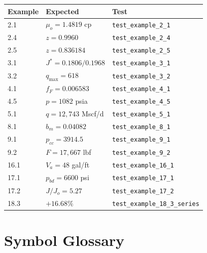 \documentclass[11pt,a4paper,openany]{book}
\newcommand{\code}[1]{\texttt{#1}}
\begin{document}
\begin{longtable}{@{}lll@{}}
\toprule
Example & Expected & Test \\
\midrule
2.1 & $\mu_o = 1.4819$ cp & \code{test\_example\_2\_1} \\
2.4 & $z = 0.9960$ & \code{test\_example\_2\_4} \\
2.5 & $z = 0.836184$ & \code{test\_example\_2\_5} \\
3.1 & $J^* = 0.1806/0.1968$ & \code{test\_example\_3\_1} \\
3.2 & $q_{\max} = 618$ & \code{test\_example\_3\_2} \\
4.1 & $f_F = 0.006583$ & \code{test\_example\_4\_1} \\
4.5 & $p = 1082$ psia & \code{test\_example\_4\_5} \\
5.1 & $q = 12{,}743$ Mscf/d & \code{test\_example\_5\_1} \\
8.1 & $b_m = 0.04082$ & \code{test\_example\_8\_1} \\
9.1 & $p_{cc} = 3914.5$ & \code{test\_example\_9\_1} \\
9.2 & $F = 17{,}667$ lbf & \code{test\_example\_9\_2} \\
16.1 & $V_a = 48$ gal/ft & \code{test\_example\_16\_1} \\
17.1 & $p_{bd} = 6600$ psi & \code{test\_example\_17\_1} \\
17.2 & $J/J_o = 5.27$ & \code{test\_example\_17\_2} \\
18.3 & $+16.68\%$ & \code{test\_example\_18\_3\_series} \\
\bottomrule
\end{longtable}

\chapter{Symbol Glossary}
\end{document}
